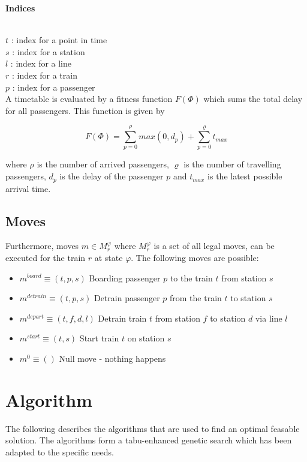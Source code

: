 \documentclass[a4paper,10pt,parskip]{article}
\begin{document}
\hfill \break

\noindent \textbf{Indices}

\noindent \\
$t$ : index for a point in time \\
$s$ : index for a station \\
$l$ : index for a line \\
$r$ : index for a train \\
$p$ : index for a passenger \\

A timetable is evaluated by a fitness function $F(\Phi)$ which sums the total 
delay for all passengers. This function is given by

$$
F(\Phi) = \sum_{p=0}^{\rho} max(0, d_{p}) + \sum_{p=0}^{\varrho} t_{max}
$$

where $\rho$ is the number of arrived passengers, $\varrho$ is the number of 
travelling passengers, $d_{p}$ is the delay of the passenger $p$ and $t_{max}$ 
is the latest possible arrival time.

\subsection{Moves}

Furthermore, moves $m \in M^{\varphi}_{r}$ where $M^{\varphi}_r$ is a set of 
all legal moves, can be executed for the train $r$ at state $\varphi$. The 
following moves are possible:

\begin{itemize}
    \item $m^{board} \equiv (t,p,s)$ Boarding passenger $p$ to the train $t$ from station $s$
    \item $m^{detrain} \equiv (t,p,s)$ Detrain passenger $p$ from the train $t$ to station $s$
    \item $m^{depart} \equiv (t,f,d,l)$ Detrain train $t$ from station $f$ to station $d$ via line $l$
    \item $m^{start} \equiv (t,s)$ Start train $t$ on station $s$
    \item $m^{0} \equiv ()$ Null move - nothing happens
\end{itemize}

\section{Algorithm}

The following describes the algorithms that are used to find an optimal feasable
solution. The algorithms form a tabu-enhanced genetic search which has been adapted 
to the specific needs. 
\end{document}
